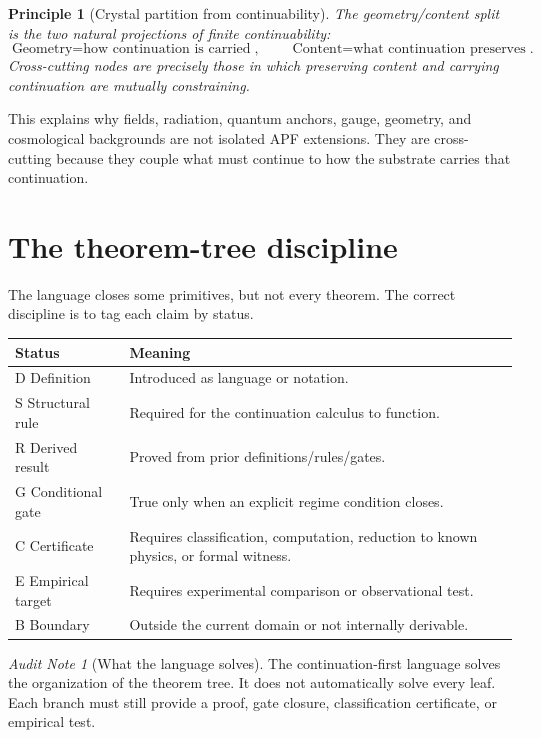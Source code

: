 \documentclass[11pt]{article}
\newtheorem{principle}[theorem]{Principle}
\theoremstyle{remark}
\newtheorem{audit}[theorem]{Audit Note}
\newcommand{\Status}[1]{\textsf{#1}}
\begin{document}
\begin{principle}[Crystal partition from continuability]
The geometry/content split is the two natural projections of finite continuability:
\[
        \boxed{\text{Geometry} = \text{how continuation is carried}},
        \qquad
        \boxed{\text{Content} = \text{what continuation preserves}}.
\]
Cross-cutting nodes are precisely those in which preserving content and carrying continuation are mutually constraining.
\end{principle}

This explains why fields, radiation, quantum anchors, gauge, geometry, and cosmological backgrounds are not isolated APF extensions.  They are cross-cutting because they couple what must continue to how the substrate carries that continuation.

\section{The theorem-tree discipline}

The language closes some primitives, but not every theorem.  The correct discipline is to tag each claim by status.

\begin{center}
\begin{tabularx}{\textwidth}{p{}X}
\toprule
\textbf{Status} & \textbf{Meaning}\\
\midrule
\Status{D} Definition & Introduced as language or notation.\\
\Status{S} Structural rule & Required for the continuation calculus to function.\\
\Status{R} Derived result & Proved from prior definitions/rules/gates.\\
\Status{G} Conditional gate & True only when an explicit regime condition closes.\\
\Status{C} Certificate & Requires classification, computation, reduction to known physics, or formal witness.\\
\Status{E} Empirical target & Requires experimental comparison or observational test.\\
\Status{B} Boundary & Outside the current domain or not internally derivable.\\
\bottomrule
\end{tabularx}
\end{center}

\begin{audit}[What the language solves]
The continuation-first language solves the organization of the theorem tree.  It does not automatically solve every leaf.  Each branch must still provide a proof, gate closure, classification certificate, or empirical test.
\end{audit}
\end{document}
